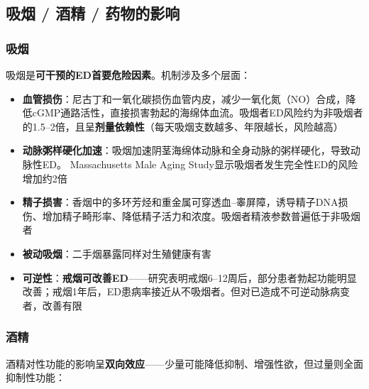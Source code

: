 \documentclass[12pt,a4paper,twoside]{ctexbook}
\begin{document}
\subsection{吸烟 / 酒精 / 药物的影响}

\subsubsection{吸烟}

吸烟是\textbf{可干预的ED首要危险因素}。机制涉及多个层面：

\begin{itemize}[leftmargin=2cm]
	\item \textbf{血管损伤}：尼古丁和一氧化碳损伤血管内皮，减少一氧化氮（NO）合成，降低cGMP通路活性，直接损害勃起的海绵体血流。吸烟者ED风险约为非吸烟者的1.5--2倍，且呈\textbf{剂量依赖性}（每天吸烟支数越多、年限越长，风险越高）
	\item \textbf{动脉粥样硬化加速}：吸烟加速阴茎海绵体动脉和全身动脉的粥样硬化，导致动脉性ED。 Massachusetts Male Aging Study显示吸烟者发生完全性ED的风险增加约2倍
	\item \textbf{精子损害}：香烟中的多环芳烃和重金属可穿透血--睾屏障，诱导精子DNA损伤、增加精子畸形率、降低精子活力和浓度。吸烟者精液参数普遍低于非吸烟者
	\item \textbf{被动吸烟}：二手烟暴露同样对生殖健康有害
	\item \textbf{可逆性}：\textbf{戒烟可改善ED}——研究表明戒烟6--12周后，部分患者勃起功能明显改善；戒烟1年后，ED患病率接近从不吸烟者。但对已造成不可逆动脉病变者，改善有限
\end{itemize}

\subsubsection{酒精}

酒精对性功能的影响呈\textbf{双向效应}——少量可能降低抑制、增强性欲，但过量则全面抑制性功能：
\end{document}
